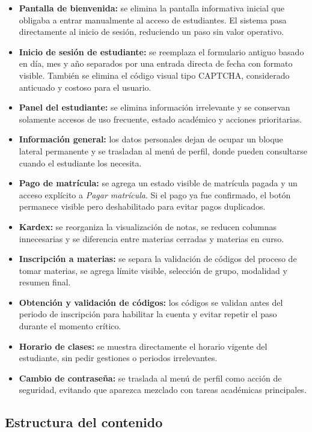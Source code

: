 \begin{itemize}
  \item \textbf{Pantalla de bienvenida:} se elimina la pantalla informativa inicial que obligaba a entrar manualmente al acceso de estudiantes. El sistema pasa directamente al inicio de sesión, reduciendo un paso sin valor operativo.
  \item \textbf{Inicio de sesión de estudiante:} se reemplaza el formulario antiguo basado en día, mes y año separados por una entrada directa de fecha con formato visible. También se elimina el código visual tipo CAPTCHA, considerado anticuado y costoso para el usuario.
  \item \textbf{Panel del estudiante:} se elimina información irrelevante y se conservan solamente accesos de uso frecuente, estado académico y acciones prioritarias.
  \item \textbf{Información general:} los datos personales dejan de ocupar un bloque lateral permanente y se trasladan al menú de perfil, donde pueden consultarse cuando el estudiante los necesita.
  \item \textbf{Pago de matrícula:} se agrega un estado visible de matrícula pagada y un acceso explícito a \textit{Pagar matrícula}. Si el pago ya fue confirmado, el botón permanece visible pero deshabilitado para evitar pagos duplicados.
  \item \textbf{Kardex:} se reorganiza la visualización de notas, se reducen columnas innecesarias y se diferencia entre materias cerradas y materias en curso.
  \item \textbf{Inscripción a materias:} se separa la validación de códigos del proceso de tomar materias, se agrega límite visible, selección de grupo, modalidad y resumen final.
  \item \textbf{Obtención y validación de códigos:} los códigos se validan antes del periodo de inscripción para habilitar la cuenta y evitar repetir el paso durante el momento crítico.
  \item \textbf{Horario de clases:} se muestra directamente el horario vigente del estudiante, sin pedir gestiones o periodos irrelevantes.
  \item \textbf{Cambio de contraseña:} se traslada al menú de perfil como acción de seguridad, evitando que aparezca mezclado con tareas académicas principales.
\end{itemize}

\subsection{Estructura del contenido}

